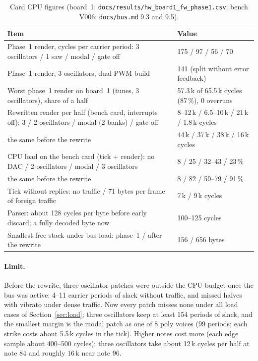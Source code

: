 \documentclass[11pt,a4paper]{article}
\newcommand{\file}[1]{\texttt{#1}}
\begin{document}
\begin{table}[htbp]
\centering\small
\caption{Card CPU figures (board~1: \file{docs/results/hw\_board1\_fw\_phase1.csv}; bench V006: \file{docs/bus.md}
9.3 and 9.5).}\label{tab:cpu}
\begin{tabularx}{\textwidth}{@{}X l@{}}
\toprule
Item & Value \\
\midrule
Phase~1 render, cycles per carrier period: 3 oscillators / 1 saw / modal / gate off & 175 / 97 / 56 / 70 \\
Phase~1 render, 3 oscillators, dual-PWM build & 141 (split without error feedback) \\
Worst phase~1 render on board~1 (tunes, 3 oscillators), share of a half & 57.3\,k of 65.5\,k cycles (87\,\%), 0 overruns \\
Rewritten render per half (bench card, interrupts off): 3 / 2 oscillators / modal (2 banks) / gate off & 8--12\,k / 6.5--10\,k / 21\,k / 1.8\,k cycles \\
\quad the same before the rewrite & 44\,k / 37\,k / 38\,k / 16\,k cycles \\
CPU load on the bench card (tick + render): no DAC / 2 oscillators / modal / 3 oscillators & 8 / 25 / 32--43 / 23\,\% \\
\quad the same before the rewrite & 8 / 82 / 59--79 / 91\,\% \\
Tick without replies: no traffic / 71 bytes per frame of foreign traffic & 7\,k / 9\,k cycles \\
Parser: about 128 cycles per byte before early discard; a fully decoded byte now & 100--125 cycles \\
Smallest free stack under bus load: phase~1 / after the rewrite & 156 / 656 bytes \\
\bottomrule
\end{tabularx}
\end{table}

\paragraph{Limit.} Before the rewrite, three-oscillator patches were outside the CPU budget once the bus was active:
4--11 carrier periods of slack without traffic, and missed halves with vibrato under dense traffic. Now every patch
misses none under all load cases of Section~\ref{sec:load}; three oscillators keep at least 154 periods of slack, and
the smallest margin is the modal patch as one of 8 poly voices (99 periods; each strike costs about 5.5\,k cycles in
the tick). Higher notes cost more (each edge sample about 400--500 cycles): three oscillators take about 12\,k cycles
per half at note 84 and roughly 16\,k near note 96.
\end{document}
